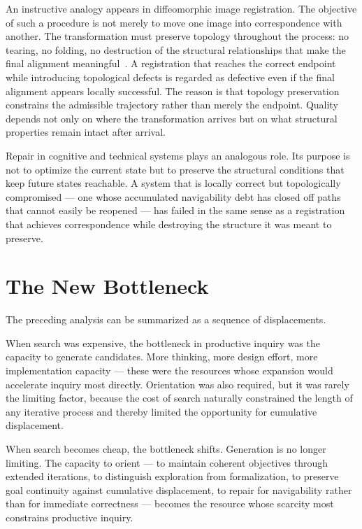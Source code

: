 An instructive analogy appears in diffeomorphic image registration. The
objective of such a procedure is not merely to move one image into correspondence
with another. The transformation must preserve topology throughout the process:
no tearing, no folding, no destruction of the structural relationships that make
the final alignment meaningful~\cite{fireants2026}. A registration that reaches
the correct endpoint while introducing topological defects is regarded as
defective even if the final alignment appears locally successful. The reason
is that topology preservation constrains the admissible trajectory rather than
merely the endpoint. Quality depends not only on where the transformation
arrives but on what structural properties remain intact after arrival.

Repair in cognitive and technical systems plays an analogous role. Its purpose
is not to optimize the current state but to preserve the structural conditions
that keep future states reachable. A system that is locally correct but
topologically compromised --- one whose accumulated navigability debt has closed
off paths that cannot easily be reopened --- has failed in the same sense as
a registration that achieves correspondence while destroying the structure it
was meant to preserve.

\section{The New Bottleneck}

The preceding analysis can be summarized as a sequence of displacements.

When search was expensive, the bottleneck in productive inquiry was the capacity
to generate candidates. More thinking, more design effort, more implementation
capacity --- these were the resources whose expansion would accelerate inquiry
most directly. Orientation was also required, but it was rarely the limiting
factor, because the cost of search naturally constrained the length of any
iterative process and thereby limited the opportunity for cumulative displacement.

When search becomes cheap, the bottleneck shifts. Generation is no longer
limiting. The capacity to orient --- to maintain coherent objectives through
extended iterations, to distinguish exploration from formalization, to preserve
goal continuity against cumulative displacement, to repair for navigability
rather than for immediate correctness --- becomes the resource whose scarcity
most constrains productive inquiry.

